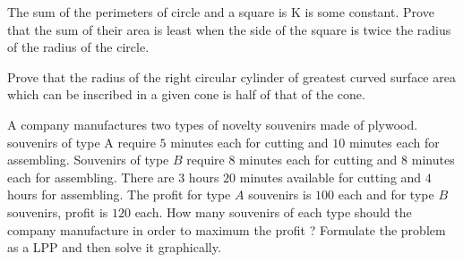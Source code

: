 \item The sum of the perimeters of circle and a square is K is some constant. Prove that the sum of their area is least when the side of the square is twice the radius of the radius of the circle.  
\item Prove that the radius of the right circular cylinder of greatest curved surface area which can be inscribed in a given cone is half of that of the cone.
  \item A company manufactures two types of novelty souvenirs made of plywood. souvenirs of type A require $5$ minutes each for cutting and $10$ minutes each for assembling. Souvenirs of type $B$ require $8$ minutes each for cutting and $8$ minutes each for assembling. There are 3 hours $20$ minutes available for cutting and $4$hours for assembling. The profit for type $A$ souvenirs is \rupee$ 100$ each and for type $B$ souvenirs, profit is \rupee $120$ each. How many souvenirs of each type should the company manufacture in order to maximum the profit ? Formulate the problem as a LPP and then solve it graphically. 


